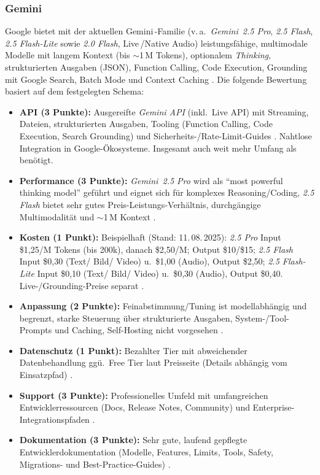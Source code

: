     \subsubsection{Gemini}

      Google bietet mit der aktuellen Gemini\,-Familie (v.\,a.\ \emph{Gemini~2{.}5 Pro}, \emph{2{.}5 Flash}, \emph{2{.}5 Flash-Lite} sowie \emph{2{.}0 Flash}, Live\,/Native Audio) leistungsfähige, multimodale Modelle mit langem Kontext (bis \(\sim\)1\,M Tokens), optionalem \emph{Thinking}, strukturierten Ausgaben (JSON), Function Calling, Code Execution, Grounding mit Google Search, Batch Mode und Context Caching \autocite{google-gemini-docs-2025}.
      Die folgende Bewertung basiert auf dem festgelegten Schema:

      \begin{itemize}
        \item \textbf{\acs{API} (3 Punkte):} Ausgereifte \emph{Gemini \acs{API}} (inkl.\ Live \acs{API}) mit Streaming, Dateien, strukturierten Ausgaben, Tooling (Function Calling, Code Execution, Search Grounding) und Sicherheits-/Rate-Limit-Guides \autocite{google-gemini-docs-2025}. Nahtlose Integration in Google-Ökosysteme.
        Insgesamt auch weit mehr Umfang als benötigt.
        \item \textbf{Performance (3 Punkte):} \emph{Gemini~2{.}5 Pro} wird als \enquote{most powerful thinking model} geführt und eignet sich für komplexes Reasoning/Coding, \emph{2{.}5 Flash} bietet sehr gutes Preis-Leistungs-Verhältnis, durchgängige Multimodalität und \(\sim\)1\,M Kontext \autocite{google-gemini-docs-2025}.
        \item \textbf{Kosten (1 Punkt):} Beispielhaft (Stand: 11.\,08.\,2025): \emph{2{.}5 Pro} Input \$1{,}25/M Tokens (bis 200k), danach \$2{,}50/M; Output \$10/\$15; \emph{2{.}5 Flash} Input \$0{,}30 (Text/ Bild/ Video) u.\ \$1{,}00 (Audio), Output \$2{,}50; \emph{2{.}5 Flash-Lite} Input \$0{,}10 (Text/ Bild/ Video) u.\ \$0{,}30 (Audio), Output \$0{,}40. Live-/Grounding-Preise separat \autocite{google-gemini-pricing-2025}.
        \item \textbf{Anpassung (2 Punkte):} Feinabstimmung/Tuning ist modellabhängig und begrenzt, starke Steuerung über strukturierte Ausgaben, System-/Tool-Prompts und Caching, Self-Hosting nicht vorgesehen \autocite{google-gemini-docs-2025}.
        \item \textbf{Datenschutz (1 Punkt):} Bezahlter Tier mit abweichender Datenbehandlung ggü.\ Free Tier laut Preisseite (Details abhängig vom Einsatzpfad) \autocite{google-gemini-pricing-2025}.
        \item \textbf{Support (3 Punkte):} Professionelles Umfeld mit umfangreichen Entwicklerressourcen (Docs, Release Notes, Community) und Enterprise-Integrationspfaden \autocite{google-gemini-docs-2025}.
        \item \textbf{Dokumentation (3 Punkte):} Sehr gute, laufend gepflegte Entwicklerdokumentation (Modelle, Features, Limits, Tools, Safety, Migrations- und Best-Practice-Guides) \autocite{google-gemini-docs-2025}.
      \end{itemize}


